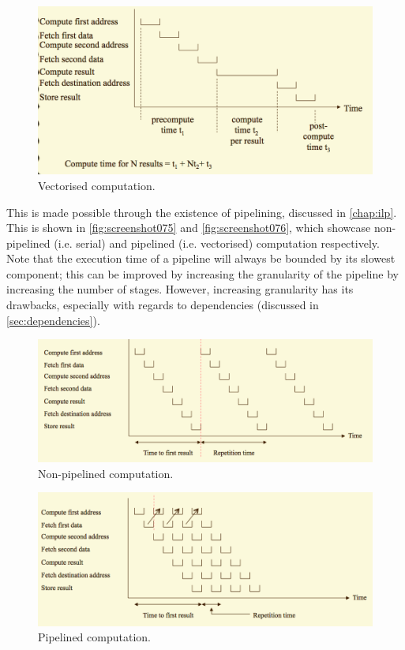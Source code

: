\begin{figure}
\centering
\includegraphics[width=0.7\linewidth]{screenshot074}
\caption{Vectorised computation.}
\label{fig:screenshot074}
\end{figure}

This is made possible through the existence of pipelining, discussed in \autoref{chap:ilp}. This is shown in \autoref{fig:screenshot075} and \autoref{fig:screenshot076}, which showcase non-pipelined (i.e. serial) and pipelined (i.e. vectorised) computation respectively. Note that the execution time of a pipeline will always be bounded by its slowest component; this can be improved by increasing the granularity of the pipeline by increasing the number of stages. However, increasing granularity has its drawbacks, especially with regards to dependencies (discussed in \autoref{sec:dependencies}).

\begin{figure}
\centering
\includegraphics[width=0.7\linewidth]{screenshot075}
\caption{Non-pipelined computation.}
\label{fig:screenshot075}
\end{figure}

\begin{figure}
\centering
\includegraphics[width=0.7\linewidth]{screenshot076}
\caption{Pipelined computation.}
\label{fig:screenshot076}
\end{figure}


